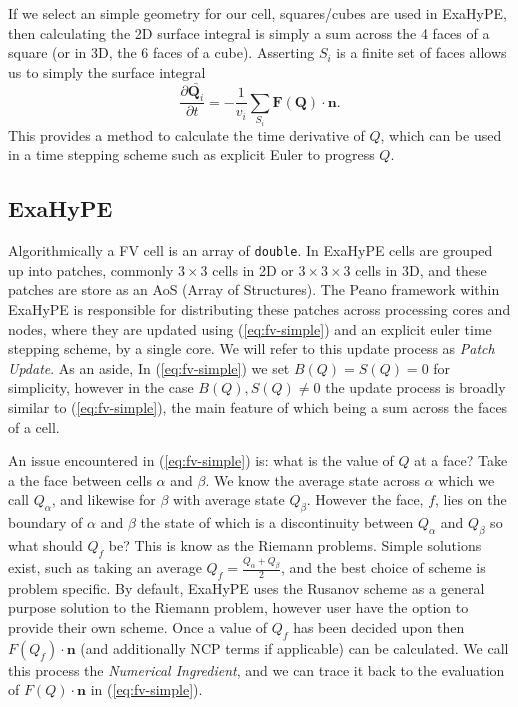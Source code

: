 If we select an simple geometry for our cell, squares/cubes are used in ExaHyPE, then calculating the 2D surface integral is simply a sum across the 4 faces of a square (or in 3D, the 6 faces of a cube).
Asserting $S_i$ is a finite set of faces allows us to simply the surface integral
\begin{equation}\label{eq:fv-simple}
   \frac{\partial \bar{\mathbf{Q}_i}}{\partial t} = -\frac{1}{v_i} \sum_{S_i}\mathbf{F}(\mathbf{Q})\cdot \mathbf{n}.
\end{equation}
This provides a method to calculate the time derivative of $Q$, which can be used in a time stepping scheme such as explicit Euler to progress $Q$.


\subsection{ExaHyPE}
\newcommand{\proc}[1]{\textit{#1}}
Algorithmically a FV cell is an array of \texttt{double}.
In ExaHyPE cells are grouped up into patches, commonly $3\times 3$ cells in 2D or $3\times 3 \times 3$ cells in 3D, and these patches are store as an AoS (Array of Structures).
The Peano framework within ExaHyPE is responsible for distributing these patches across processing cores and nodes, where they are updated using (\ref{eq:fv-simple}) and an explicit euler time stepping scheme, by a single core.
We will refer to this update process as \proc{Patch Update}.
As an aside, In (\ref{eq:fv-simple}) we set $B(Q)=S(Q)=0$ for simplicity, however in the case $B(Q), S(Q)\neq 0$ the update process is broadly similar to (\ref{eq:fv-simple}), the main feature of which being a sum across the faces of a cell.

An issue encountered in (\ref{eq:fv-simple}) is: what is the value of $Q$ at a face?
Take a the face between cells $\alpha$ and $\beta$.
We know the average state across $\alpha$ which we call $Q_\alpha$, and likewise for $\beta$ with average state $Q_\beta$.
However the face, $f$, lies on the boundary of $\alpha$ and $\beta$ the state of which is a discontinuity between $Q_\alpha$ and $Q_\beta$ so what should $Q_f$ be?
This is know as the Riemann problems.
Simple solutions exist, such as taking an average $Q_f = \frac{Q_\alpha + Q_\beta}{2}$, and the best choice of scheme is problem specific.
By default, ExaHyPE uses the Rusanov scheme \cite{rusanov} as a general purpose solution to the Riemann problem, however user have the option to provide their own scheme.
Once a value of $Q_f$ has been decided upon then $F(Q_f)\cdot \mathbf{n}$ (and additionally NCP terms if applicable) can be calculated.
We call this process the \proc{Numerical Ingredient}, and we can trace it back to the evaluation of $F(Q)\cdot\mathbf{n}$ in (\ref{eq:fv-simple}).


